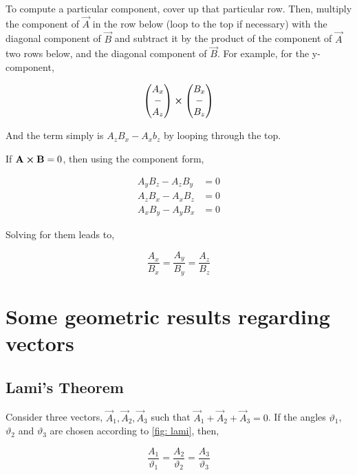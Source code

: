 To compute a particular component, cover up that particular row. Then, multiply the component 
of \(\vec{A}\) in the row below (loop to the top if necessary) 
with the diagonal component of \(\vec{B}\) and
subtract it by the product of the component of \(\vec{A}\) two rows below, and the
diagonal component of \(\vec{B}\). For example, for the y-component,

\[
\begin{pmatrix}
    A_x \\
    - \\
    A_z
\end{pmatrix} \cp
%
\begin{pmatrix}
    B_x \\
    - \\
    B_z
\end{pmatrix}
%
\]

And the term simply is \(A_zB_x - A_xb_z\) by looping through the top.

If \(\vec{A} \cp \vec{B} = 0\), then using the component form, 

\begin{align*}
        A_yB_z - A_zB_y &= 0\\
        A_zB_x - A_xB_z &= 0\\
        A_xB_y - A_yB_x &= 0
\end{align*}

Solving for them leads to,

\begin{equation*}
    \frac{A_x}{B_x} = \frac{A_y}{B_y} = \frac{A_z}{B_z}
\end{equation*}

\section{Some geometric results regarding vectors}

\subsection{Lami's Theorem}

Consider three vectors, \(\vec{A}_1, \vec{A}_2, \vec{A}_3\) such that 
\(\vec{A}_1 + \vec{A}_2 + \vec{A}_3 = 0\). If the angles \(\vartheta_1\), \(\vartheta_2\)
and \(\vartheta_3\) are chosen according to \cref{fig: lami}, then,

\begin{theorem}
    \begin{equation*}
        \frac{A_1}{\vartheta_1} = \frac{A_2}{\vartheta_2} = \frac{A_3}{\vartheta_3}
    \end{equation*}
\end{theorem}

